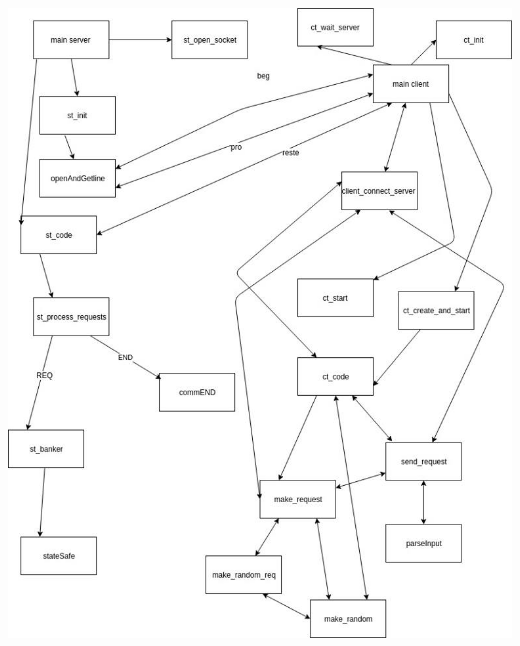 \documentclass[11pt]{article}
\begin{document}
\includegraphics[width=\textwidth,height=\textheight,keepaspectratio]{CLIENTSERVER}





\end{document}
